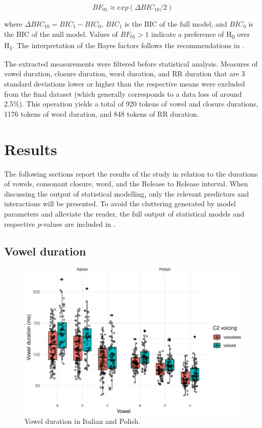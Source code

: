 \documentclass[preprint]{JASAnew}
\begin{document}
\begin{equation}
\label{eq:bayes}
BF_{01} \approx exp(\Delta{}BIC_{10}/2)
\end{equation}

where \(\Delta{}BIC_{10} = BIC_1 - BIC_0\), \(BIC_1\) is the BIC of the
full model, and \(BIC_0\) is the BIC of the null model. Values of
\(BF_{01} > 1\) indicate a preference of H\textsubscript{0} over
H\textsubscript{1}. The interpretation of the Bayes factors follows the
recommendations in \citet[p.~139]{raftery1995}.

The extracted measurements were filtered before statistical analysis.
Measures of vowel duration, closure duration, word duration, and RR
duration that are 3 standard deviations lower or higher than the
respective means were excluded from the final dataset (which generally
corresponds to a data loss of around 2.5\%). This operation yields a
total of 920 tokens of vowel and closure durations, 1176 tokens of word
duration, and 848 tokens of RR duration.

\hypertarget{results}{%
\section{Results}\label{results}}

The following sections report the results of the study in relation to
the durations of vowels, consonant closure, word, and the Release to
Release interval. When discussing the output of statistical modelling,
only the relevant predictors and interactions will be presented. To
avoid the cluttering generated by model parameters and alleviate the
reader, the full output of statistical models and respective
\emph{p}-values are included in .

\hypertarget{vowel-duration}{%
\subsection{Vowel duration}\label{vowel-duration}}

\begin{figure}
\includegraphics{2018-jasa_files/figure-latex/vowels-plot-1} \caption{Vowel duration in Italian and Polish.}\label{f:vowels-plot}
\end{figure}
\end{document}
